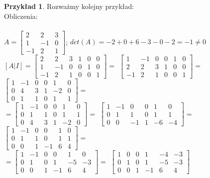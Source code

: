 \documentclass{article}
\theoremstyle{definition}
\theoremstyle{definition}
\theoremstyle{definition}
\newtheorem{pk}{Przykład}[subsection]
\theoremstyle{definition}
\begin{document}
\begin{pk}
    Rozważmy kolejny przykład:\\
    Obliczenia:\\\\
    $ A = \left[\begin{array}{ccc}
        2 & 2 & 3 \\
        1 & -1 & 0 \\
        -1 & 2 & 1 
    \end{array}\right]  $;
    $ det (A) = -2 + 0 + 6 -3 -0 -2 = -1 \neq 0$\\
    $ [A|I]=\left[\begin{array}{ccc|ccc}
        2 & 2 & 3 & 1 & 0 & 0 \\
        1 & -1 & 0 & 0 & 1 & 0 \\
        -1 & 2 & 1 & 0 & 0 & 1
    \end{array}\right] =$
    $ \left[\begin{array}{ccc|ccc}
        1 & -1 & 0 & 0 & 1 & 0 \\
        2 & 2 & 3 & 1 & 0 & 0 \\
        -1 & 2 & 1 & 0 & 0 & 1 
        \end{array}\right] =$
    $ \left[\begin{array}{ccc|ccc}
        1 & -1 & 0 & 0 & 1 & 0 \\
        0 & 4 & 3 & 1 & -2 & 0 \\
        0 & 1 & 1 & 0 & 1 & 1 
        \end{array}\right] =$\\
    $ =\left[\begin{array}{ccc|ccc}
        1 & -1 & 0 & 0 & 1 & 0 \\
        0 & 1 & 1 & 0 & 1 & 1 \\
        0 & 4 & 3 & 1 & -2 & 0 
        \end{array}\right] =$
    $ \left[\begin{array}{ccc|ccc}
        1 & -1 & 0 & 0 & 1 & 0 \\
        0 & 1 & 1 & 0 & 1 & 1 \\
        0 & 0 & -1 & 1 & -6 & -4 
        \end{array}\right]  =$
    $ \left[\begin{array}{ccc|ccc}
        1 & -1 & 0 & 0 & 1 & 0 \\
        0 & 1 & 1 & 0 & 1 & 1 \\
        0 & 0 & 1 & -1 & 6 & 4 
        \end{array}\right]  =$\\
    $ =\left[\begin{array}{ccc|ccc}
        1 & -1 & 0 & 0 & 1 & 0 \\
        0 & 1 & 0 & 1 & -5 & -3 \\
        0 & 0 & 1 & -1 & 6 & 4 
        \end{array}\right] =$
    $ \left[\begin{array}{ccc|ccc}
        1 & 0 & 0 & 1 & -4 & -3 \\
        0 & 1 & 0 & 1 & -5 & -3 \\
        0 & 0 & 1 & -1 & 6 & 4 
        \end{array}\right]  $\\


\end{pk}
\end{document}
